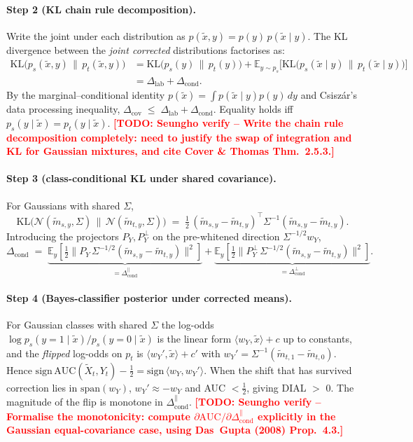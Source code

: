 \documentclass[11pt,a4paper]{article}
\newcommand{\E}{\mathbb{E}}
\newcommand{\KL}{\mathrm{KL}}
\newcommand{\TODO}[1]{\textbf{\textcolor{red}{[TODO: Seungho verify -- #1]}}}
\begin{document}
\paragraph{Step 2 (KL chain rule decomposition).}
Write the joint under each distribution as
$p(\tilde x,y)=p(y)\,p(\tilde x\mid y)$. The KL divergence between
the \emph{joint corrected} distributions factorises as:
\begin{align*}
  \KL\!\bigl(p_s(\tilde x,y)\,\|\,p_t(\tilde x,y)\bigr)
   &= \KL\!\bigl(p_s(y)\,\|\,p_t(y)\bigr)
      + \E_{y\sim p_s}\bigl[
        \KL\!\bigl(p_s(\tilde x\mid y)\,\|\,
                   p_t(\tilde x\mid y)\bigr)\bigr]\\
   &= \Delta_{\text{lab}} + \Delta_{\text{cond}}.
\end{align*}
By the marginal--conditional identity
$p(\tilde x) = \int p(\tilde x\mid y)p(y)\,dy$ and Csisz\'ar's data
processing inequality,
$
  \Delta_{\text{cov}} \;\le\; \Delta_{\text{lab}} + \Delta_{\text{cond}}.
$
Equality holds iff $p_s(y\mid \tilde x)=p_t(y\mid \tilde x)$. \TODO{Write
the chain rule decomposition completely: need to justify the swap of
integration and KL for Gaussian mixtures, and cite Cover \& Thomas
Thm.~2.5.3.}

\paragraph{Step 3 (class-conditional KL under shared covariance).}
For Gaussians with shared $\Sigma$,
\[
  \KL\!\bigl(\mathcal{N}(\tilde m_{s,y},\Sigma)\,\|\,
             \mathcal{N}(\tilde m_{t,y},\Sigma)\bigr)
  \;=\; \tfrac12\,
        (\tilde m_{s,y}-\tilde m_{t,y})^{\!\top}
        \Sigma^{-1}
        (\tilde m_{s,y}-\tilde m_{t,y}).
\]
Introducing the projectors $P_Y,P_Y^{\perp}$ on the pre-whitened
direction $\Sigma^{-1/2}w_Y$,
\[
  \Delta_{\text{cond}}
  \;=\; \underbrace{\E_y[\tfrac12\|P_Y\,\Sigma^{-1/2}
        (\tilde m_{s,y}-\tilde m_{t,y})\|^{2}]}_{=\Delta_{\text{cond}}^{\parallel}}
      + \underbrace{\E_y[\tfrac12\|P_Y^{\perp}\,\Sigma^{-1/2}
        (\tilde m_{s,y}-\tilde m_{t,y})\|^{2}]}_{=\Delta_{\text{cond}}^{\perp}}.
\]

\paragraph{Step 4 (Bayes-classifier posterior under corrected means).}
For Gaussian classes with shared $\Sigma$ the log-odds
$\log p_s(y{=}1\mid\tilde x)/p_s(y{=}0\mid\tilde x)$ is the linear
form $\langle w_Y,\tilde x\rangle + c$ up to constants, and the
\emph{flipped} log-odds on $p_t$ is
$\langle w_Y',\tilde x\rangle + c'$ with
$w_Y' = \Sigma^{-1}(\tilde m_{t,1}-\tilde m_{t,0})$. Hence
$\mathrm{sign}\,\mathrm{AUC}(\tilde X_t,Y_t)-\tfrac12
 = \mathrm{sign}\,\langle w_Y,w_Y'\rangle$. When the shift that has
survived correction lies in $\mathrm{span}(w_Y)$, $w_Y'\approx-w_Y$
and AUC $<\tfrac12$, giving DIAL $>$ 0. The magnitude of the flip is
monotone in $\Delta_{\text{cond}}^{\parallel}$. \TODO{Formalise the
monotonicity: compute $\partial\mathrm{AUC}/\partial
\Delta_{\text{cond}}^{\parallel}$ explicitly in the Gaussian equal-covariance
case, using Das~Gupta (2008) Prop.~4.3.}
\end{document}
